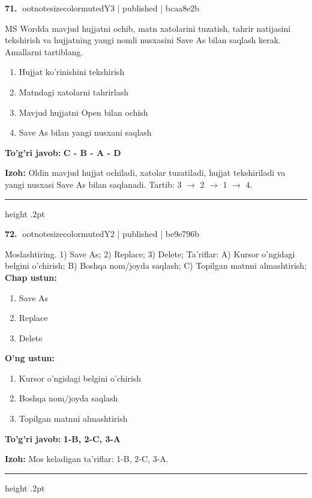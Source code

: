 \documentclass[10pt,a4paper]{article}
\begin{document}
\textbf{\color{ink}71.} {ootnotesizecolor{muted}Y3 | published | bcaa8e2b}
\par
MS Wordda mavjud hujjatni ochib, matn xatolarini tuzatish, tahrir natijasini tekshirish va hujjatning yangi nomli nusxasini Save As bilan saqlash kerak. Amallarni tartiblang.
\begin{enumerate}[label=\Alph*),leftmargin=9mm]
\item Hujjat ko'rinishini tekshirish
\item Matndagi xatolarni tahrirlash
\item Mavjud hujjatni Open bilan ochish
\item Save As bilan yangi nusxani saqlash
\end{enumerate}
\begin{tcolorbox}[enhanced,breakable,colback=teal!4,colframe=teal!55!black,boxrule=0.45pt,arc=1.2mm,left=2.8mm,right=2.8mm,top=2mm,bottom=2mm]
\textbf{\color{teal}To'g'ri javob:} \textbf{C - B - A - D}
\par\smallskip
\textbf{Izoh:} Oldin mavjud hujjat ochiladi, xatolar tuzatiladi, hujjat tekshiriladi va yangi nusxasi Save As bilan saqlanadi. Tartib: 3 \ensuremath{\rightarrow} 2 \ensuremath{\rightarrow} 1 \ensuremath{\rightarrow} 4.
\end{tcolorbox}
\vspace{2mm}\hrule height .2pt\vspace{2mm}

\textbf{\color{ink}72.} {ootnotesizecolor{muted}Y2 | published | be9e796b}
\par
Moslashtiring.  1) Save As;  2) Replace;  3) Delete;  Ta'riflar: A) Kursor o'ngidagi belgini o'chirish;  B) Boshqa nom/joyda saqlash;  C) Topilgan matnni almashtirish;
\textbf{Chap ustun:}\begin{enumerate}[label=\arabic*),leftmargin=9mm]
\item Save As
\item Replace
\item Delete
\end{enumerate}
\textbf{O'ng ustun:}\begin{enumerate}[label=\Alph*),leftmargin=9mm]
\item Kursor o'ngidagi belgini o'chirish
\item Boshqa nom/joyda saqlash
\item Topilgan matnni almashtirish
\end{enumerate}
\begin{tcolorbox}[enhanced,breakable,colback=teal!4,colframe=teal!55!black,boxrule=0.45pt,arc=1.2mm,left=2.8mm,right=2.8mm,top=2mm,bottom=2mm]
\textbf{\color{teal}To'g'ri javob:} \textbf{1-B, 2-C, 3-A}
\par\smallskip
\textbf{Izoh:} Mos keladigan ta'riflar: 1-B, 2-C, 3-A.
\end{tcolorbox}
\vspace{2mm}\hrule height .2pt\vspace{2mm}
\end{document}

